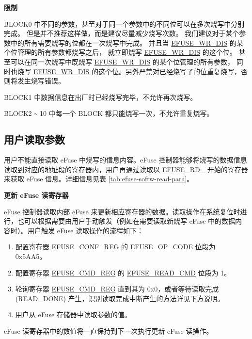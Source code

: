\documentclass[main\_\_CN.tex]{subfiles}
\begin{document}
{\bfseries 限制}

BLOCK0 中不同的参数，甚至对于同一个参数中的不同位可以在多次烧写中分别完成。
但是并不推荐这样做，而是建议尽量减少烧写次数。
我们建议对于某个参数中的所有需要烧写的位都在一次烧写中完成。
并且当 \hyperref[fielddesc:EFUSEWRDIS]{EFUSE\_WR\_DIS} 的某个位管理的所有参数都烧写之后，
就立即烧写 \hyperref[fielddesc:EFUSEWRDIS]{EFUSE\_WR\_DIS} 的这个位。
甚至可以在同一次烧写中既烧写 \hyperref[fielddesc:EFUSEWRDIS]{EFUSE\_WR\_DIS} 的某个位管理的所有参数，
同时也烧写 \hyperref[fielddesc:EFUSEWRDIS]{EFUSE\_WR\_DIS} 的这个位。另外严禁对已经烧写了的位重复烧写，否则将发生烧写错误。

BLOCK1 中数据信息在出厂时已经烧写完毕，不允许再次烧写。

BLOCK2 \verb+~+ 10 中每一个 BLOCK 都只能烧写一次，不允许重复烧写。


\subsection{用户读取参数}
\label{sec:efuse-software-read-para}

用户不能直接读取 eFuse 中烧写的信息内容。eFuse 控制器能够将烧写的数据信息读取到对应的地址段的寄存器内，用户再通过读取以 EFUSE\_RD\_ 开始的寄存器来获取 eFuse 信息。详细信息见表 \ref{tab:efuse-softw-read-para}。



{\bfseries 更新 eFuse 读寄存器}
\label{sec:efuse-update-reg}

eFuse 控制器读取内部 eFuse 来更新相应寄存器的数据。读取操作在系统复位时进行，也可以根据需要由用户手动触发（例如在需要读取新烧写 eFuse 中的数据内容时）。用户触发 eFuse 读取操作的流程如下：
\begin{enumerate}
    \item 配置寄存器 \hyperref[regdesc:EFUSECONFREG]{EFUSE\_CONF\_REG} 的 \hyperref[fielddesc:EFUSEOPCODE]{EFUSE\_OP\_CODE} 位段为 0x{}5AA5。
    \item 配置寄存器 \hyperref[regdesc:EFUSECMDREG]{EFUSE\_CMD\_REG} 的 \hyperref[fielddesc:EFUSEREADCMD]{EFUSE\_READ\_CMD} 位段为 1。
    \item 轮询寄存器 \hyperref[regdesc:EFUSECMDREG]{EFUSE\_CMD\_REG} 直到其为 0x{}0，或者等待读取完成 (READ\_DONE) 产生，识别读取完成中断产生的方法详见下方说明。
    \item 用户从 eFuse 存储器中读取参数的值。
\end{enumerate}
eFuse 读寄存器中的数值将一直保持到下一次执行更新 eFuse 读操作。
\end{document}

